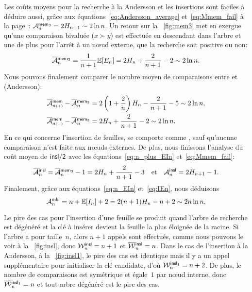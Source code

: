 Les coûts moyens pour la recherche à la Andersson et les insertions
sont faciles à déduire aussi, grâce aux
équations~\eqref{eq:Andersson_average} 
et~\eqref{eq:Mmem_fail} à la page~\pageref{eq:Mmem_fail}:
\(\M{\fun{mem}_3}{n} = 2H_{n+1} \sim 2 \ln
n\). Un retour sur la
\fig~\vref{fig:mem3} met en exergue qu'une comparaison bivaluée (\(x
\succ y\)) est effectuée en descendant dans l'arbre et une de plus
pour l'arrêt à un n{\oe}ud externe, que la recherche soit positive ou
non:
\begin{equation*}
  \OM{\fun{mem}_3}{n} = \frac{1}{n+1}\Expected{E_n} =
  2H_n + \frac{2}{n+1} - 2 \sim 2\ln n.
\end{equation*}
Nous pouvons finalement comparer le nombre moyen de comparaisons entre
 et  (Andersson):
\begin{align*}
  \OM{\fun{mem}}{n{\scriptscriptstyle(+)}} - \OM{\fun{mem}_3}{n}
&= 2\left(1 + \frac{2}{n}\right)H_n - \frac{2}{n+1} - 5 \sim 2\ln n,\\
  \OM{\fun{mem}}{n{\scriptscriptstyle(-)}} - \OM{\fun{mem}_3}{n}
&= 2H_n + \frac{2}{n+1} - 2 \sim 2\ln n.
\end{align*}
En ce qui concerne l'insertion de feuilles,
 se comporte comme
, sauf qu'aucune
comparaison n'est faite aux n{\oe}uds externes. De plus, nous
finissons l'analyse du coût moyen de \(\fun{insl/2}\) avec les
équations~\eqref{eq:n_plus_EIn} et~\eqref{eq:Mmem_fail}:
\begin{equation*}
  \OM{\fun{insl}}{n} =
  \OM{\fun{mem}_3}{n} - 1 = 2H_n + \frac{2}{n+1} -
  3\quad\text{et}\quad \M{\fun{insl}}{n} = 2H_{n+1} - 1.
\index{insl@$\OM{\fun{insl}}{n}$}
\index{mem3@$\OM{\fun{mem}_3}{n}$}
\end{equation*}
Finalement, grâce aux équations~\eqref{eq:n_EIn} et~\eqref{eq:IEn},
nous déduisons
\begin{equation}
\M{\fun{mkl}}{n} = n + \Expected{I_n} + 2 = 2(n+1)H_n - n + 2
\sim 2n\ln n.
\index{mkl@$\M{\fun{mkl}}{n}$}
\label{eq:Mmkl}
\end{equation}


Le pire des cas pour l'insertion d'une feuille se produit quand
l'arbre de recherche est dégénéré
et la clé à insérer devient la feuille la plus éloignée de la racine.
Si l'arbre a pour taille~\(n\), alors \(n+1\) appels sont effectués,
comme nous pouvons le voir à la \fig~\vref{fig:insl}, donc
\(\W{\fun{insl}}{n} = n + 1\) et
\(\OW{\fun{insl}}{n} = n\). Dans le
cas de l'insertion à la Andersson, à la \fig~\vref{fig:insl1}, le pire
des cas est identique mais il y a un appel supplémentaire pour
initialiser la clé candidate, d'où \(\W{\fun{insl}_1}{n} = n +
2\). De plus, le nombre de
comparaisons est symétrique et égale~\(1\) par n{\oe}ud interne, donc
\(\OW{\fun{insl}_1}{n} = n\) et
tout arbre dégénéré est le pire des cas.

